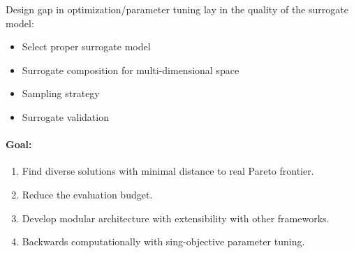         Design gap in optimization/parameter tuning lay in the quality of the surrogate model:
            \begin{itemize}
                \item Select proper surrogate model
                \item Surrogate composition for multi-dimensional space
                \item Sampling strategy
                \item Surrogate validation
            \end{itemize}

        \paragraph{Goal:}
        \begin{enumerate}
            \item Find diverse solutions with minimal distance to real Pareto frontier.
            \item Reduce the evaluation budget.
            \item Develop modular architecture with extensibility with other frameworks. 
            \item Backwards computationally with sing-objective parameter tuning.
        \end{enumerate}








